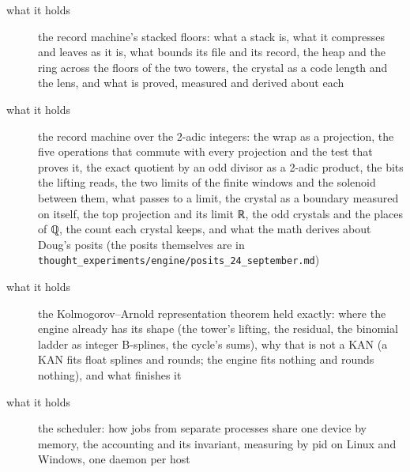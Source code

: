 \begin{description}
\item[{what it holds}] the record machine's stacked floors: what a stack is, what it compresses and leaves as it is, what bounds its file and its record, the heap and the ring across the floors of the two towers, the crystal as a code length and the lens, and what is proved, measured and derived about each
\end{description}

\begin{description}
\item[{what it holds}] the record machine over the 2-adic integers: the wrap as a projection, the five operations that commute with every projection and the test that proves it, the exact quotient by an odd divisor as a 2-adic product, the bits the lifting reads, the two limits of the finite windows and the solenoid between them, what passes to a limit, the crystal as a boundary measured on itself, the top projection and its limit ℝ, the odd crystals and the places of ℚ, the count each crystal keeps, and what the math derives about Doug's posits (the posits themselves are in \texttt{thought\_\allowbreak{}experiments/\allowbreak{}engine/\allowbreak{}posits\_\allowbreak{}24\_\allowbreak{}september.\allowbreak{}md})
\end{description}

\begin{description}
\item[{what it holds}] the Kolmogorov–Arnold representation theorem held exactly: where the engine already has its shape (the tower's lifting, the residual, the binomial ladder as integer B-splines, the cycle's sums), why that is not a KAN (a KAN fits float splines and rounds; the engine fits nothing and rounds nothing), and what finishes it
\end{description}

\begin{description}
\item[{what it holds}] the scheduler: how jobs from separate processes share one device by memory, the accounting and its invariant, measuring by pid on Linux and Windows, one daemon per host
\end{description}

